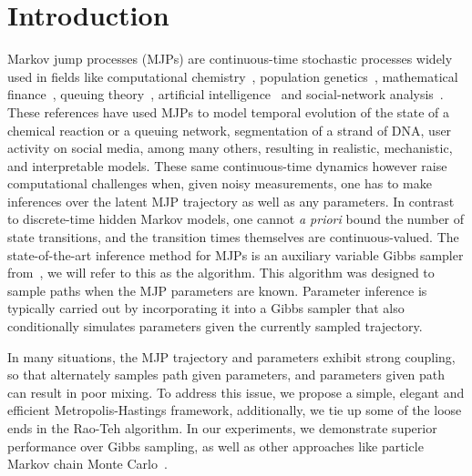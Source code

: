
\section{Introduction}
\label{sec:intro}
Markov jump processes (MJPs) are continuous-time stochastic processes 
widely used in fields like computational chemistry~\cite{gillespie97}, 
population genetics~\cite{FearnSher2006}, mathematical finance~\cite{Elliott06}, 
queuing theory~\cite{Breuer2003}, artificial intelligence~\cite{XuShe10} and
social-network analysis~\cite{pan2016markov}. %
These references have used MJPs to model temporal evolution of the state 
of a chemical reaction or a queuing network, segmentation of a strand of 
DNA, user activity on social media, among many others, resulting in 
realistic, mechanistic, and interpretable models. %
These same continuous-time dynamics however raise computational
challenges when, given noisy 
measurements, one has to make inferences over the latent MJP 
trajectory as well as any parameters. 
In contrast to {discrete-time} hidden Markov models, one cannot 
{\em a priori} bound the number of state transitions, and the transition 
times themselves are continuous-valued. 
The state-of-the-art inference method for MJPs is an auxiliary variable 
Gibbs sampler from~\cite{RaoTeh13}, we will refer to this as the {\algname} 
algorithm. This  algorithm was designed to sample paths when the MJP parameters
are known. Parameter inference is typically carried out by 
incorporating it into a Gibbs sampler that also conditionally simulates
parameters given the currently sampled trajectory. 

In many situations, the MJP trajectory and parameters exhibit 
strong coupling, so that alternately samples path given
parameters, and parameters given path can result in poor mixing.  
To address this issue, we propose a simple, elegant and efficient 
Metropolis-Hastings framework, additionally, we tie up some of the loose 
ends in the Rao-Teh algorithm.
In our experiments, we demonstrate superior 
performance over Gibbs sampling, as well as other approaches like 
particle Markov chain Monte Carlo~\cite{Andrieu10}.

